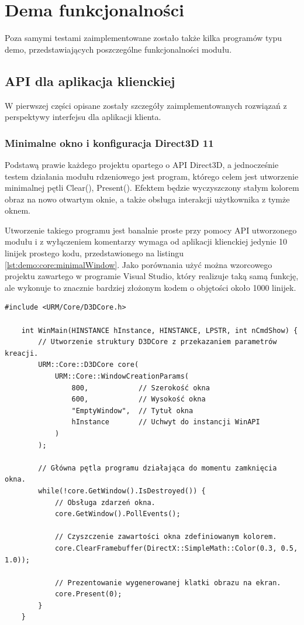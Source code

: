 \chapter{Dema funkcjonalności}
Poza samymi testami zaimplementowane zostało także kilka programów typu demo, przedstawiających poszczególne funkcjonalności modułu.

\section{API dla aplikacja klienckiej}
W pierwszej części opisane zostały szczegóły zaimplementowanych rozwiązań z perspektywy interfejsu dla aplikacji klienta. 

\subsection{Minimalne okno i konfiguracja Direct3D 11}
Podstawą prawie każdego projektu opartego o API Direct3D, a jednocześnie testem działania modułu rdzeniowego jest program, którego celem jest utworzenie minimalnej pętli Clear(), Present(). Efektem będzie wyczyszczony stałym kolorem obraz na nowo otwartym oknie, a także obsługa interakcji użytkownika z tymże oknem.

Utworzenie takiego programu jest banalnie proste przy pomocy API utworzonego modułu i z wyłączeniem komentarzy wymaga od aplikacji klienckiej jedynie 10 linijek prostego kodu, przedstawionego na listingu \ref{lst:demo:core:minimalWindow}. Jako porównania użyć można wzorcowego projektu zawartego w programie Visual Studio, który realizuje taką samą funkcję, ale wykonuje to znacznie bardziej złożonym kodem o objętości około 1000 linijek.

\vfill

\begin{lstlisting}[caption={Pełny kod programu wykorzystującego API modułu do utworzenia minimalnego okna.}, label={lst:demo:core:minimalWindow}]
	#include <URM/Core/D3DCore.h>
	
	int WinMain(HINSTANCE hInstance, HINSTANCE, LPSTR, int nCmdShow) {
		// Utworzenie struktury D3DCore z przekazaniem parametrów kreacji. 
		URM::Core::D3DCore core(
			URM::Core::WindowCreationParams(
				800,            // Szerokość okna
				600,            // Wysokość okna
				"EmptyWindow",  // Tytuł okna
				hInstance       // Uchwyt do instancji WinAPI
			)
		);
	    
		// Główna pętla programu działająca do momentu zamknięcia okna.
		while(!core.GetWindow().IsDestroyed()) {
			// Obsługa zdarzeń okna.
			core.GetWindow().PollEvents();

			// Czyszczenie zawartości okna zdefiniowanym kolorem.
			core.ClearFramebuffer(DirectX::SimpleMath::Color(0.3, 0.5, 1.0));

			// Prezentowanie wygenerowanej klatki obrazu na ekran.
			core.Present(0);
		}
	}
\end{lstlisting}

